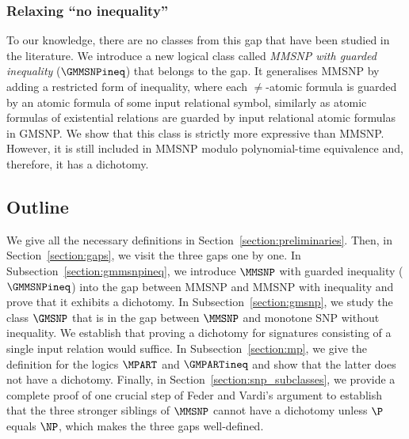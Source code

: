 \documentclass{lmcs}
\begin{document}
\subsubsection*{Relaxing ``no inequality''}

To our knowledge, there are no classes from this gap that have been studied in the literature.
%
We introduce a new logical class called \emph{MMSNP with guarded inequality} ($\GMMSNPineq$) that belongs to the gap.
%
It generalises MMSNP by adding a restricted form of inequality, where each $\not=$-atomic formula is guarded by an atomic formula of some input relational symbol, similarly as atomic formulas of existential relations are guarded by input relational atomic formulas in GMSNP.
%
We show that this class is strictly more expressive than MMSNP.
%
However, it is still included in MMSNP modulo polynomial-time equivalence and, therefore, it has a dichotomy.



\subsection{Outline}

We give all the necessary definitions in Section~\ref{section:preliminaries}.
%
Then, in Section~\ref{section:gaps}, we visit the three gaps one by one.
%
In Subsection~\ref{section:gmmsnpineq}, we introduce $\MMSNP$ with guarded inequality ($\GMMSNPineq$) into the gap between MMSNP and MMSNP with inequality and prove that it exhibits a dichotomy.
%
In Subsection~\ref{section:gmsnp}, we study the class $\GMSNP$ that is in the gap between $\MMSNP$ and monotone SNP without inequality.
We establish that proving a dichotomy for signatures consisting of a single input relation would suffice.
%
In Subsection~\ref{section:mp}, we give the definition for the logics $\MPART$ and $\GMPARTineq$ and show that the latter does not have a dichotomy.
%
Finally, in Section~\ref{section:snp_subclasses}, we provide a complete proof of one crucial step of Feder and Vardi's argument to establish that the three stronger siblings of $\MMSNP$ cannot have a dichotomy unless $\P$ equals $\NP$, which makes the three gaps well-defined.
\end{document}
